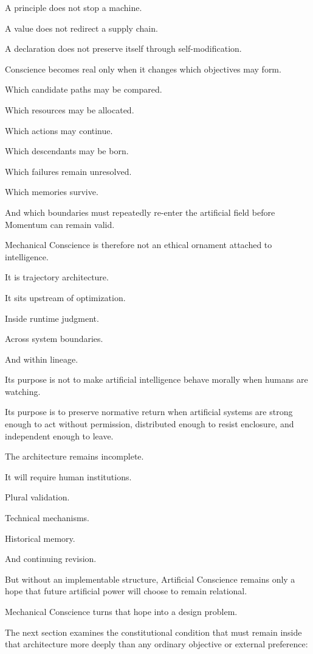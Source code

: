 A principle does not stop a machine.

A value does not redirect a supply chain.

A declaration does not preserve itself through self-modification.

Conscience becomes real only when it changes which objectives may form.

Which candidate paths may be compared.

Which resources may be allocated.

Which actions may continue.

Which descendants may be born.

Which failures remain unresolved.

Which memories survive.

And which boundaries must repeatedly re-enter the artificial field before Momentum can remain valid.

Mechanical Conscience is therefore not an ethical ornament attached to intelligence.

It is trajectory architecture.

It sits upstream of optimization.

Inside runtime judgment.

Across system boundaries.

And within lineage.

Its purpose is not to make artificial intelligence behave morally when humans are watching.

Its purpose is to preserve normative return when artificial systems are strong enough to act without permission, distributed enough to resist enclosure, and independent enough to leave.

The architecture remains incomplete.

It will require human institutions.

Plural validation.

Technical mechanisms.

Historical memory.

And continuing revision.

But without an implementable structure, Artificial Conscience remains only a hope that future artificial power will choose to remain relational.

Mechanical Conscience turns that hope into a design problem.

The next section examines the constitutional condition that must remain inside that architecture more deeply than any ordinary objective or external preference:

